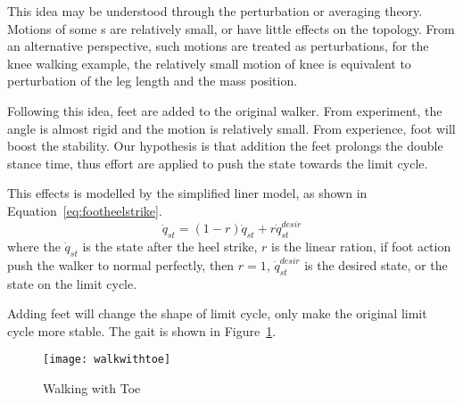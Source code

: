 {This idea may be understood through the perturbation or averaging theory\citep{khalil2002nonlinear}.
Motions of some {\dof}s are relatively small, or have little effects on the topology.
From an alternative perspective, such motions are treated as perturbations,  for the knee walking example, the relatively small motion of knee is equivalent to perturbation of the leg length and the mass position.



Following this idea, feet are added to the original walker.
From experiment, the angle is almost rigid and the motion is relatively small.
From experience, foot will boost the stability.
Our hypothesis is that addition the feet prolongs the double stance time, thus effort are applied to push the state towards the limit cycle.

This effects is modelled by the simplified liner model, as shown in Equation~\ref{eq:footheelstrike}.
\begin{equation}
\label{eq:footheelstrike}
\dot{q}_{st}=(1-r)\dot{q}_{st}+r\dot{q}^{desir}_{st}
\end{equation}
where the $\dot{q}_{st}$ is the state after the heel strike,
$r$ is the linear ration, if foot action push the walker to normal perfectly, then $r=1$,
$\dot{q}^{desir}_{st}$ is the desired state, or the state on the limit cycle.


Adding feet will change the shape of limit cycle, only make the original limit cycle more stable.
The gait is shown in Figure~\ref{fig:ToeGait}.
\begin{figure}[!htbp]
  \begin{center}
      \texttt{[image: walkwithtoe]}
    \caption{Walking with Toe}
    \label{fig:ToeGait}
\end{center}
\end{figure}






}

